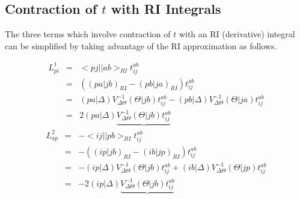 \documentclass[fleqn,12pt]{article}
\newcommand{\bra}{<\!}
\newcommand{\ket}{\!>}
\newcommand{\tijab}{{t_{ij}^{ab}}}
\newcommand{\intari}[2]{\bra #1 || #2 \ket_{RI}}
\newcommand{\intmri}[2]{( #1 | #2 )_{RI}}
\begin{document}
\begin{changebar}
\subsection{Contraction of $t$ with RI Integrals}

The three terms which involve contraction of $t$ with an RI
(derivative) integral can be simplified by taking advantage of the RI
approximation as follows.

\begin{eqnarray}
  L^1_{pi} & = & \intari{pj}{ab} \tijab \\
           & = & ( \intmri{pa}{jb} - \intmri{pb}{ja} ) \tijab \\
           & = &   (pa|\Delta) V^{-1}_{\Delta\Theta} (\Theta|jb) \tijab
                 - (pb|\Delta) V^{-1}_{\Delta\Theta} (\Theta|ja) \tijab \\
           & = & 2 (pa|\Delta) 
                   \underbrace{V^{-1}_{\Delta\Theta} (\Theta|jb) \tijab}
\end{eqnarray}
\begin{eqnarray}
  L^2_{ap} & = & - \intari{ij}{pb} \tijab \\
           & = & - ( \intmri{ip}{jb} - \intmri{ib}{jp} ) \tijab \\
           & = & -  (ip|\Delta) V^{-1}_{\Delta\Theta} (\Theta|jb) \tijab
                 +  (ib|\Delta) V^{-1}_{\Delta\Theta} (\Theta|jp) \tijab \\
           & = & -2 (ip|\Delta) 
                    \underbrace{V^{-1}_{\Delta\Theta} (\Theta|jb) \tijab}
\end{eqnarray}



\end{changebar}
\end{document}
